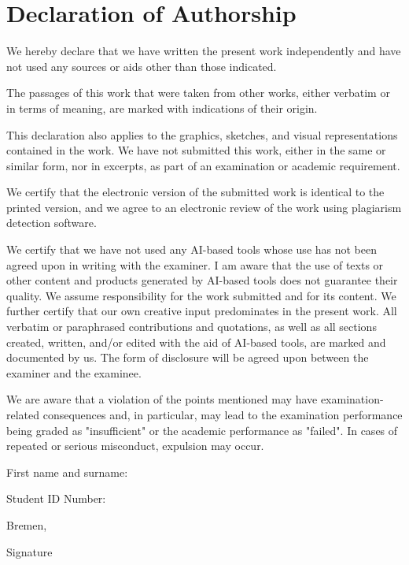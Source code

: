 \chapter{Declaration of Authorship}

We hereby declare that we have written the present work independently and have not used any sources or aids other than
those indicated.

The passages of this work that were taken from other works, either verbatim or in terms of meaning, are marked with 
indications of their origin.

This declaration also applies to the graphics, sketches, and visual representations contained in the work. We have not
submitted this work, either in the same or similar form, nor in excerpts, as part of an examination or academic
requirement.

We certify that the electronic version of the submitted work is identical to the printed version, and we agree to an
electronic review of the work using plagiarism detection software.

We certify that we have not used any AI-based tools whose use has not been agreed upon in writing with the examiner. I
am aware that the use of texts or other content and products generated by AI-based tools does not guarantee their
quality. We assume responsibility for the work submitted and for its content. We further certify that our own creative
input predominates in the present work. All verbatim or paraphrased contributions and quotations, as well as all sections
created, written, and/or edited with the aid of AI-based tools, are marked and documented by us. The form of disclosure
will be agreed upon between the examiner and the examinee.
  
We are aware that a violation of the points mentioned may have examination-related consequences and, in particular, may
lead to the examination performance being graded as "insufficient" or the academic performance as "failed". In cases
of repeated or serious misconduct, expulsion may occur.


First name and surname:

Student ID Number:


Bremen,



Signature



